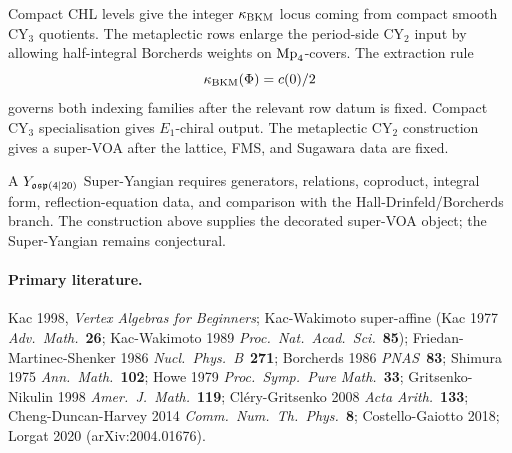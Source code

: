 Compact CHL levels give the integer \(\kappa_{\mathrm{BKM}}\) locus coming from compact
smooth CY\(_3\) quotients. The metaplectic rows enlarge the period-side
CY\(_2\) input by allowing half-integral Borcherds weights on
\(\mathrm{Mp}_4\)-covers. The extraction rule
\[
  \kappa_{\mathrm{BKM}}(\Phi)=c(0)/2
\]
governs both indexing families after the relevant row datum is fixed.
Compact CY\(_3\) specialisation gives \(E_1\)-chiral output. The
metaplectic CY\(_2\) construction gives a super-VOA after the
lattice, FMS, and Sugawara data are fixed.

A \(Y_{\mathfrak{osp}(4|20)}\) Super-Yangian requires generators, relations,
coproduct, integral form, reflection-equation data, and comparison with
the Hall-Drinfeld/Borcherds branch. The construction above supplies the
decorated super-VOA object; the Super-Yangian remains conjectural.

\paragraph{Primary literature.}
Kac 1998, \emph{Vertex Algebras for Beginners};
Kac-Wakimoto super-affine (Kac 1977 \emph{Adv.\ Math.}~\textbf{26};
Kac-Wakimoto 1989 \emph{Proc.\ Nat.\ Acad.\ Sci.}~\textbf{85});
Friedan-Martinec-Shenker 1986 \emph{Nucl.\ Phys.\ B}~\textbf{271};
Borcherds 1986 \emph{PNAS}~\textbf{83};
Shimura 1975 \emph{Ann.\ Math.}~\textbf{102};
Howe 1979 \emph{Proc.\ Symp.\ Pure Math.}~\textbf{33};
Gritsenko-Nikulin 1998 \emph{Amer.\ J.\ Math.}~\textbf{119};
Cl\'ery-Gritsenko 2008 \emph{Acta Arith.}~\textbf{133};
Cheng-Duncan-Harvey 2014 \emph{Comm.\ Num.\ Th.\ Phys.}~\textbf{8};
Costello-Gaiotto 2018;
Lorgat 2020 (arXiv:2004.01676).
